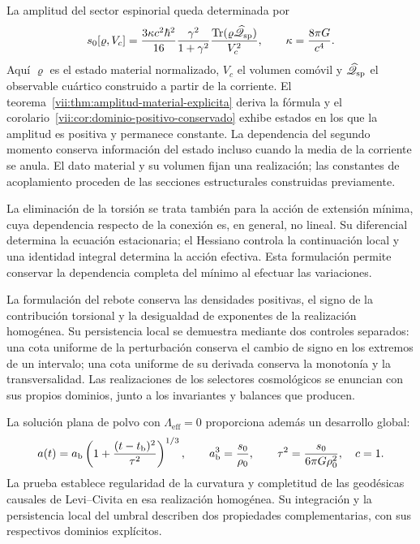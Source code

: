 La amplitud del sector espinorial queda determinada por
\begin{equation}
 s_0[\varrho,V_c]
 =\frac{3\kappa c^2\hbar^2}{16}
   \frac{\gamma^2}{1+\gamma^2}
   \frac{\operatorname{Tr}
    (\varrho\widehat{\mathscr Q}_{\rm sp})}{V_c^2},
 \qquad \kappa=\frac{8\pi G}{c^4}.
 \label{vii:eq:programa-amplitud}
\end{equation}
Aquí \(\varrho\) es el estado material normalizado, \(V_c\) el volumen
comóvil y \(\widehat{\mathscr Q}_{\rm sp}\) el observable cuártico
construido a partir de la corriente. El
teorema~\ref{vii:thm:amplitud-material-explicita} deriva la fórmula y
el corolario~\ref{vii:cor:dominio-positivo-conservado} exhibe estados
en los que la amplitud es positiva y permanece constante. La dependencia
del segundo momento conserva información del estado incluso cuando la
media de la corriente se anula. El dato material y su volumen fijan una
realización; las constantes de acoplamiento proceden de las secciones
estructurales construidas previamente.

La eliminación de la torsión se trata también para la acción de
extensión mínima, cuya dependencia respecto de la conexión es, en
general, no lineal. Su diferencial determina la ecuación estacionaria;
el Hessiano controla la continuación local y una identidad integral
determina la acción efectiva. Esta formulación permite conservar la
dependencia completa del mínimo al efectuar las variaciones.

La formulación del rebote conserva las densidades positivas, el signo de
la contribución torsional y la desigualdad de exponentes de la realización
homogénea. Su persistencia local se demuestra mediante dos controles
separados: una cota uniforme de la perturbación conserva el cambio de
signo en los extremos de un intervalo; una cota uniforme de su derivada
conserva la monotonía y la transversalidad. Las realizaciones de los
selectores cosmológicos se enuncian con sus propios dominios, junto a los
invariantes y balances que producen.

La solución plana de polvo con \(\Lambda_{\mathrm{eff}}=0\)
proporciona además un desarrollo global:
\[
 a(t)=a_{\rm b}\left(1+
       \frac{(t-t_{\rm b})^2}{\tau^2}\right)^{1/3},
 \qquad
 a_{\rm b}^3=\frac{s_0}{\rho_0},\qquad
 \tau^2=\frac{s_0}{6\pi G\rho_0^2},
 \quad c=1.
\]
La prueba establece regularidad de la curvatura y completitud de las
geodésicas causales de Levi--Civita en esa realización homogénea.
Su integración y la persistencia local
del umbral describen dos propiedades complementarias, con sus
respectivos dominios explícitos.

